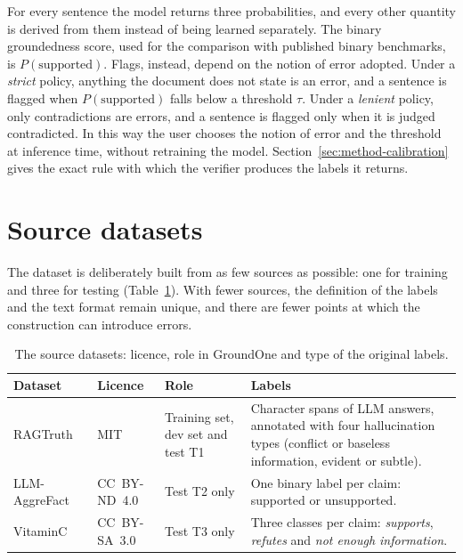 For every sentence the model returns three probabilities, and every other quantity is derived from them instead of
being learned separately. The binary groundedness score, used for the comparison with published binary benchmarks, is
$P(\text{supported})$. Flags, instead, depend on the notion of error adopted. Under a \emph{strict} policy, anything
the document does not state is an error, and a sentence is flagged when $P(\text{supported})$ falls below a threshold
$\tau$. Under a \emph{lenient} policy, only contradictions are errors, and a sentence is flagged only when it is judged
contradicted. In this way the user chooses the notion of error and the threshold at inference time, without retraining
the model. Section~\ref{sec:method-calibration} gives the exact rule with which the verifier produces the labels it
returns.

\section{Source datasets}
\label{sec:data-sources}

The dataset is deliberately built from as few sources as possible: one for training and three for testing
(Table~\ref{tab:data-sources}). With fewer sources, the definition of the labels and the text format remain unique, and
there are fewer points at which the construction can introduce errors.

\begin{table}[htbp]
\centering
\caption{The source datasets: licence, role in GroundOne and type of the original labels.}
\label{tab:data-sources}
\small
\begin{tabularx}{\textwidth}{@{}>{\raggedright\arraybackslash}p{}>{\raggedright\arraybackslash}p{}>{\raggedright\arraybackslash}p{}>{\raggedright\arraybackslash}X@{}}
\toprule
Dataset & Licence & Role & Labels \\
\midrule
RAGTruth~\cite{niu2024ragtruth} & MIT & Training set, dev set and test T1 & Character spans of LLM answers, annotated with four hallucination types (conflict or baseless information, evident or subtle). \\ \addlinespace
\mbox{LLM-AggreFact}~\cite{tang2024minicheck,llmaggrefact} & \mbox{CC BY-ND 4.0} & Test T2 only & One binary label per claim: supported or unsupported. \\ \addlinespace
VitaminC~\cite{schuster2021vitaminc} & \mbox{CC BY-SA 3.0} & Test T3 only & Three classes per claim: \emph{supports}, \emph{refutes} and \emph{not enough information}. \\
\bottomrule
\end{tabularx}
\end{table}

